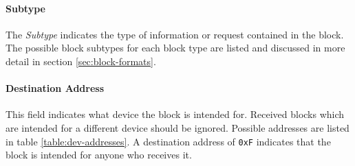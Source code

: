 \paragraph{Subtype}
The \emph{Subtype} indicates the type of information or request contained in the
block. The possible block subtypes for each block type are listed and  discussed
in more detail in section \ref{sec:block-formats}.

\paragraph{Destination Address}
This field indicates what device the block is intended for. Received blocks 
which are intended for a different device should be ignored. Possible addresses
are listed in table \ref{table:dev-addresses}. A destination address of
\lstinline{0xF} indicates that the block is intended for anyone who receives it.

